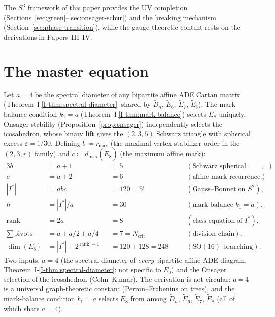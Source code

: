 The $S^3$ framework of this paper provides the UV completion
(Sections~\ref{sec:green}--\ref{sec:onsager-schur}) and the
breaking mechanism (Section~\ref{sec:phase-transition}), while
the gauge-theoretic content rests on the derivations in
Papers~III--IV.

\section{The master equation}
\label{sec:master-equation}

\begin{theorem}\label{thm:master}
Let $a = 4$ be the spectral diameter of any bipartite
affine ADE Cartan matrix
(Theorem~I-\ref{I-thm:spectral-diameter};
shared by $\tilde{D}_n$, $\tilde{E}_6$, $\tilde{E}_7$,
$\tilde{E}_8$).
The mark-balance condition $k_1 = a$
(Theorem~I-\ref{I-thm:mark-balance})
selects $E_8$ uniquely.
Onsager stability (Proposition~\ref{prop:onsager}) independently
selects the icosahedron, whose binary lift gives the $(2,3,5)$
Schwarz triangle with spherical excess $\varepsilon = 1/30$.
Defining $b \coloneqq r_{\max}$ (the maximal vertex stabilizer
order in the $(2,3,r)$ family) and
$c \coloneqq d_{\max}(\tilde{E}_8)$ (the maximum affine mark):
\begin{alignat}{3}
  b &= a+1 &&= 5  &\quad&(\text{Schwarz spherical bound}),\\
  c &= a+2 &&= 6  &&(\text{affine mark recurrence}),\\
  |I^*| &= abc &&= 120 = 5!
    &&(\text{Gauss--Bonnet on } S^2),\\
  h &= |I^*|/a &&= 30
    &&(\text{mark-balance } k_1 = a), \\
  \operatorname{rank} &= 2a &&= 8
    &&(\text{class equation of } I^*),\\
  \textstyle\sum\text{pivots} &= a{+}a/2{+}a/4 &&= 7 = N_{\mathrm{crit}}
    &&(\text{division chain}), \\
  \dim(E_8) &= |I^*| + 2^{\operatorname{rank}-1} &&= 120 + 128 = 248
    &&(\mathrm{SO}(16)\text{ branching}).
\end{alignat}
Two inputs: $a = 4$ (the spectral diameter of
\emph{every} bipartite affine ADE diagram,
Theorem~I-\ref{I-thm:spectral-diameter};
not specific to $E_8$)
and the Onsager selection of the icosahedron (Cohn--Kumar).
The derivation is not circular: $a = 4$ is a universal
graph-theoretic constant (Perron--Frobenius on trees),
and the mark-balance condition $k_1 = a$ selects $E_8$
from among $\tilde{D}_n$, $\tilde{E}_6$, $\tilde{E}_7$,
$\tilde{E}_8$ (all of which share $a = 4$).
\end{theorem}

